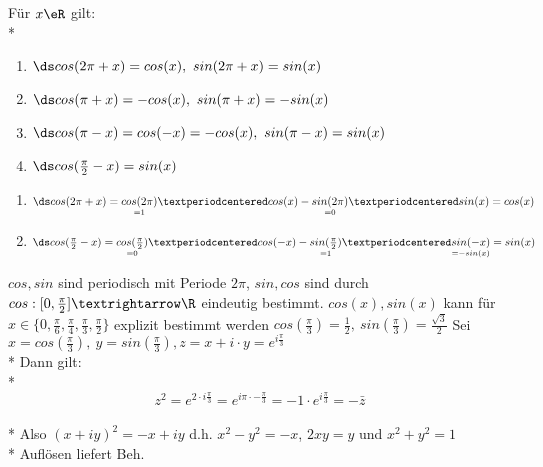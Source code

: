 Für $x\eR$ gilt:\\*
\begin{enumerate}
\item{$\ds cos(2\pi+x)=cos(x),\ sin(2\pi+x)=sin(x)$}
\item{$\ds cos(\pi+x)=-cos(x),\ sin(\pi+x)=-sin(x)$}
\item{$\ds cos(\pi-x)=cos(-x)=-cos(x),\ sin(\pi-x)=sin(x)$}
\item{$\ds cos(\frac{\pi}{2}-x)=sin(x)$}
\end{enumerate}
\begin{enumerate}
\item{$\ds cos(2\pi+x)=\underset{=1}{cos(2\pi)}·cos(x)-\underset{=0}{sin(2\pi)}·sin(x)=cos(x)$}
\setcounter{enumi}{3}
\item{$\ds cos(\frac{\pi}{2}-x)=\underset{=0}{cos(\frac{\pi}{2})}·cos(-x)-\underset{=1}{sin(\frac{\pi}{2})}·\underset{=-sin(x)}{sin(-x)}=sin(x)$}
\end{enumerate}
\bem
$cos,sin$ sind periodisch mit Periode $2\pi$, $sin,cos$ sind durch $cos:[0,\frac{\pi}{2}]→\R$ eindeutig bestimmt.
\bem
$cos(x),sin(x)$ kann für $x\in \{0,\frac{\pi}{6},\frac{\pi}{4},\frac{\pi}{3},\frac{\pi}{2}\}$ explizit bestimmt werden
\bsp
$cos(\frac{\pi}{3})=\frac{1}{2},\ sin(\frac{\pi}{3})=\frac{\sqrt{3}}{2}$
\bew
	Sei $x = cos (\frac{\pi}{3}),\ y = sin(\frac{\pi}{3}), z = x + i\cdot y = e^{i\frac{\pi}{3}}$\\*
	Dann gilt:\\*
	$$z^2 = e^{2 \cdot i\frac{\pi}{3}} = e^{i\pi \cdot - \frac{\pi}{3}} = -1 \cdot e^{i\frac{\pi}{3}} = -\bar{z}$$\\*
	Also $(x + iy)^2 = -x + iy$ d.h. $x^2 - y^2 = -x$, $2xy = y$ und $x^2 + y^2 = 1$\\*
	Auflösen liefert Beh.